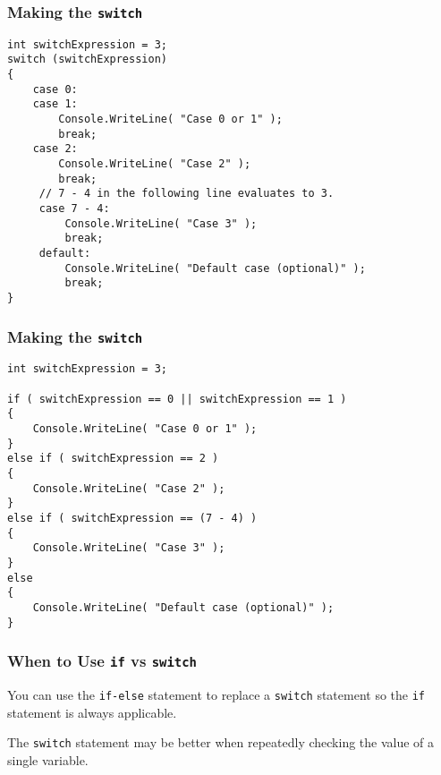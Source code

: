 \begin{frame}[fragile]
\frametitle{Making the \texttt{switch}}

{\scriptsize
\begin{verbatim}
int switchExpression = 3;
switch (switchExpression)
{
    case 0:
    case 1:
        Console.WriteLine( "Case 0 or 1" );
        break;
    case 2:
        Console.WriteLine( "Case 2" );
        break;
     // 7 - 4 in the following line evaluates to 3. 
     case 7 - 4:
         Console.WriteLine( "Case 3" );
         break;   
     default:
         Console.WriteLine( "Default case (optional)" );
         break;
}
\end{verbatim}
}

\end{frame}

\begin{frame}[fragile]
\frametitle{Making the \texttt{switch}}

{\scriptsize
\begin{verbatim}
int switchExpression = 3;

if ( switchExpression == 0 || switchExpression == 1 )
{
    Console.WriteLine( "Case 0 or 1" );
} 
else if ( switchExpression == 2 )
{
    Console.WriteLine( "Case 2" );
} 
else if ( switchExpression == (7 - 4) )
{
    Console.WriteLine( "Case 3" );
}
else
{
    Console.WriteLine( "Default case (optional)" );
}
\end{verbatim}
}

\end{frame}

\begin{frame}
\frametitle{When to Use \texttt{if} vs \texttt{switch}}

You can use the \texttt{if-else} statement to replace a \texttt{switch} statement so the \texttt{if} statement is always applicable.

The \texttt{switch} statement may be better when repeatedly checking the value of a single variable.

\end{frame} 




